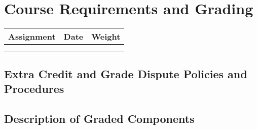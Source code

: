 \documentclass[10pt]{article}
\begin{document}
\section{Course Requirements and Grading}

%
\begin{tabular}[h]{lll}
{\bfseries Assignment} & {\bfseries Date} & {\bfseries Weight}\\ \hline
&&\\
&&\\
\end{tabular}
\subsection*{Extra Credit and Grade Dispute Policies and Procedures}
%
\subsection*{Description of Graded Components}
%
\end{document}
